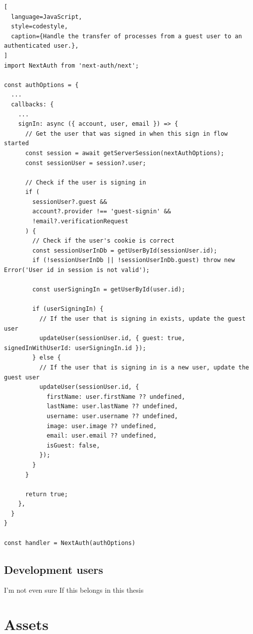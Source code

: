 \begin{lstlisting}[
  language=JavaScript,
  style=codestyle,
  caption={Handle the transfer of processes from a guest user to an authenticated user.},
]
import NextAuth from 'next-auth/next';

const authOptions = {
  ...
  callbacks: {
    ...
    signIn: async ({ account, user, email }) => {
      // Get the user that was signed in when this sign in flow started
      const session = await getServerSession(nextAuthOptions);
      const sessionUser = session?.user;

      // Check if the user is signing in
      if (
        sessionUser?.guest &&
        account?.provider !== 'guest-signin' &&
        !email?.verificationRequest
      ) {
        // Check if the user's cookie is correct
        const sessionUserInDb = getUserById(sessionUser.id);
        if (!sessionUserInDb || !sessionUserInDb.guest) throw new Error('User id in session is not valid');

        const userSigningIn = getUserById(user.id);

        if (userSigningIn) {
          // If the user that is signing in exists, update the guest user
          updateUser(sessionUser.id, { guest: true, signedInWithUserId: userSigningIn.id });
        } else {
          // If the user that is signing in is a new user, update the guest user
          updateUser(sessionUser.id, {
            firstName: user.firstName ?? undefined,
            lastName: user.lastName ?? undefined,
            username: user.username ?? undefined,
            image: user.image ?? undefined,
            email: user.email ?? undefined,
            isGuest: false,
          });
        }
      }

      return true;
    },
  }
}

const handler = NextAuth(authOptions)
\end{lstlisting}


\subsection{Development users}
\label{cha:ms-architecture:users:development-users}

I'm not even sure If this belongs in this thesis

\section{Assets}

